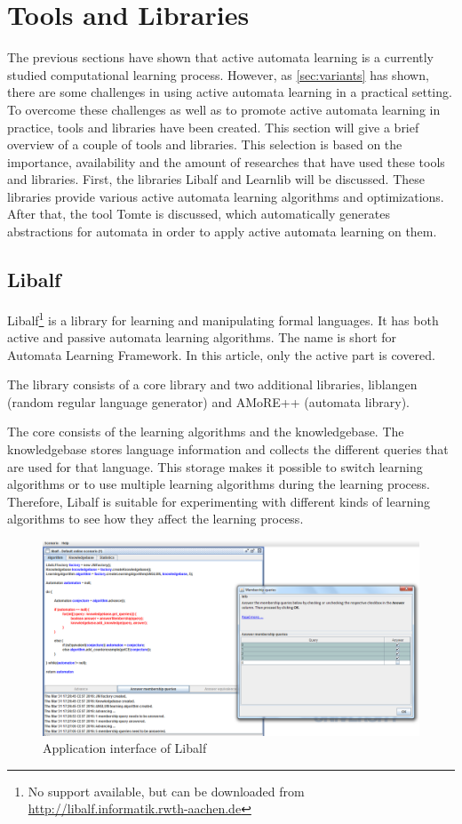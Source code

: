\documentclass[multi,crop=false,class=article]{standalone}
\begin{document}
\section{Tools and Libraries}
\label{sec:tools}
The previous sections have shown that active automata learning is a currently
studied computational learning process. However, as \cref{sec:variants} has
shown, there are some challenges in using active automata learning in a
practical setting. To overcome these challenges as well as to promote active
automata learning in practice, tools and libraries have been created. This
section will give a brief overview of a couple of tools and libraries. This
selection is based on the importance, availability and the amount of researches
that have used these tools and libraries. First, the libraries Libalf and
Learnlib will be discussed. These libraries provide various active automata
learning algorithms and optimizations. After that, the tool Tomte is discussed,
which automatically generates abstractions for automata in order to apply active
automata learning on them.


\subsection{Libalf}
\label{sssec:libalf}
Libalf\footnote{No support available, but can be downloaded from 
\url{http://libalf.informatik.rwth-aachen.de}} is a library for learning and 
manipulating formal languages. It has both active and passive automata learning 
algorithms. The name is short for Automata Learning Framework. In this article, 
only the active part is covered.

The library consists of a core library and two additional libraries, 
liblangen (random regular language generator) and AMoRE++ (automata library).

The core consists of the learning algorithms and the knowledgebase. The 
knowledgebase stores language information and collects the different queries 
that are used for that language. This storage makes it possible to switch 
learning algorithms or to use multiple learning algorithms during the learning 
process. Therefore, Libalf is suitable for experimenting with different kinds 
of learning algorithms to see how they affect the learning process. 

\begin{figure}[!ht]
	\includegraphics[width=\textwidth]{Tool_images/libalf_demo_interface.png}
	\caption{Application interface of Libalf}
	\label{fig:libalf_interface}
\end{figure}
\end{document}
